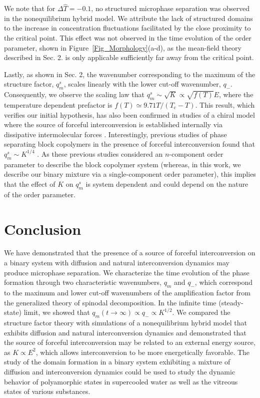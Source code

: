 \documentclass[5p,twocolumn]{elsarticle}
\begin{document}
We note that for $\Delta\hat{T}=-0.1$, no structured microphase separation was observed in the nonequilibrium hybrid model. We attribute the lack of structured domains to the increase in concentration fluctuations facilitated by the close proximity to the critical point. This effect was not observed in the time evolution of the order parameter, shown in Figure~\ref{Fig_Morphology}(a-d), as the mean-field theory described in Sec. 2. is only applicable sufficiently far away from the critical point.

Lastly, as shown in Sec. 2, the wavenumber corresponding to the maximum of the structure factor, $q_m^s$, scales linearly with the lower cut-off wavenumber, $q_-$. Consequently, we observe the scaling law that $q_m^s\sim\sqrt{K}\propto \sqrt{f(T)} E$, where the temperature dependent prefactor is $f(T)\simeq 9.71 T/(T_\text{c}-T)$. This result, which verifies our initial hypothesis, has also been confirmed in studies of a chiral model where the source of forceful interconversion is established internally via dissipative intermolecular forces \cite{Uralcan_Interconversion_2020}. Interestingly, previous studies of phase separating block copolymers in the presence of forceful interconversion found that $q_m^s\sim K^{1/4}$ \cite{Christensen_Segregation_1996,Glotzer_consistent_1994}. As these previous studies considered an $n$-component order parameter to describe the block copolymer system (whereas, in this work, we describe our binary mixture via a single-component order parameter), this implies that the effect of $K$ on $q_m^s$ is system dependent and could depend on the nature of the order parameter.

\section{Conclusion}
We have demonstrated that the presence of a source of forceful interconversion on a binary system with diffusion and natural interconversion dynamics may produce microphase separation. We characterize the time evolution of the phase formation through two characteristic wavenumbers, $q_m$ and $q_-$, which correspond to the maximum and lower cut-off wavenumbers of the amplification factor from the generalized theory of spinodal decomposition. In the infinite time (steady-state) limit, we showed that $q_m(t\to\infty)\propto q_-\propto K^{1/2}$. We compared the structure factor theory with simulations of a nonequilibrium hybrid model that exhibits diffusion and natural interconversion dynamics and demonstrated that the source of forceful interconversion may be related to an external energy source,  as $K\propto E^2$, which allows interconversion to be more energetically favorable. The study of the domain formation in a binary system exhibiting a mixture of diffusion and interconversion dynamics could be used to study the dynamic behavior of polyamorphic states in supercooled water \cite{Gallo_Tale_2016,anisimov_thermodynamics_2018} as well as the vitreous states of various substances.
\end{document}
